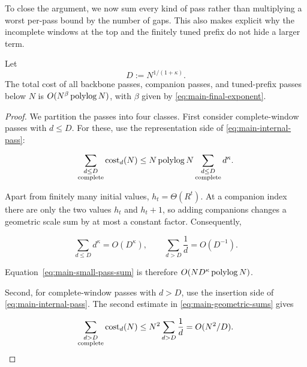 To close the argument, we now sum every kind of pass rather than multiplying a
worst per-pass bound by the number of gaps.  This also makes explicit why the
incomplete windows at the top and the finitely tuned prefix do not hide a
larger term.

\begin{proposition}
  \label{prop:main-global-sum}
  Let
  \[
    D:=N^{1/(1+\kappa)}.
  \]
  The total cost of all backbone passes, companion passes, and tuned-prefix
  passes below $N$ is $O(N^\beta\operatorname{polylog} N)$, with $\beta$ given by
  \eqref{eq:main-final-exponent}.
\end{proposition}

\begin{proof}
  We partition the passes into four classes.  First consider complete-window
  passes with $d\le D$.  For these, use the representation side of
  \eqref{eq:main-internal-pass}:

  \begin{equation}
    \sum_{\substack{d\le D\\\text{complete}}}\operatorname{cost}_d(N)
    \le N\operatorname{polylog} N
       \sum_{\substack{d\le D\\\text{complete}}}d^\kappa.
    \label{eq:main-small-pass-sum}
  \end{equation}

  Apart from finitely many initial values, $h_t=\Theta(R^t)$.  At a companion
  index there are only the two values $h_t$ and $h_t+1$, so adding companions
  changes a geometric scale sum by at most a constant factor.  Consequently,

  \begin{equation}
    \sum_{d\le D}d^\kappa=O(D^\kappa),
    \qquad
    \sum_{d>D}\frac1d=O(D^{-1}).
    \label{eq:main-geometric-sums}
  \end{equation}

  Equation~\eqref{eq:main-small-pass-sum} is therefore
  $O(ND^\kappa\operatorname{polylog} N)$.

  Second, for complete-window passes with $d>D$, use the insertion side of
  \eqref{eq:main-internal-pass}.  The second estimate in
  \eqref{eq:main-geometric-sums} gives

  \begin{equation}
    \sum_{\substack{d>D\\\text{complete}}}\operatorname{cost}_d(N)
    \le N^2\sum_{d>D}\frac1d
    =O(N^2/D).
    \label{eq:main-large-pass-sum}
  \end{equation}


\end{proof}

